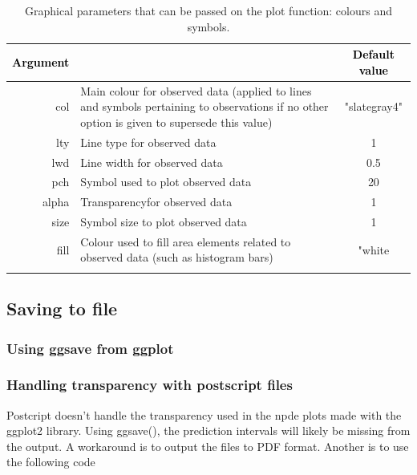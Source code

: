 \documentclass{article}
\begin{document}
\begin{table}[!h] 
\begin{center}
\begin{tabular}{| r p{8cm} c|}
\hline
\textbf{\textcolor{black}{Argument}} & \centering{\textbf{\textcolor{black}{Description }}} & \textbf{\textcolor{black}{Default value}} \\
\hline
{\ttfamily col} & Main colour for observed data (applied to lines and symbols pertaining to observations if no other option is given to supersede this value) & "slategray4"  \\
{\ttfamily lty} & Line type for observed data & 1 \\
{\ttfamily lwd} & Line width for observed data & 0.5 \\
{\ttfamily pch} & Symbol used to plot observed data &  20 \\
{\ttfamily alpha} & Transparencyfor observed data  & 1 \\
{\ttfamily size} & Symbol size to plot observed data & 1  \\
{\ttfamily fill} & Colour used to fill area elements related to observed data (such as histogram bars) & "white  \\
{\ttfamily } & &  \\
\hline
\end{tabular} 
\end{center}
\caption{Graphical parameters that can be passed on the plot function: colours and symbols.} \label{tab:graphicalOptions2}
\end{table} 


\clearpage
\newpage

\subsection{Saving to file}

\subsubsection{Using ggsave from ggplot}

\subsubsection{Handling transparency with postscript files}

Postcript doesn't handle the transparency used in the {\sf npde} plots made with the {\sf ggplot2} library. Using {\sf ggsave()}, the prediction intervals will likely be missing from the output. A workaround is to output the files to PDF format. Another is to use the following code
\end{document}
